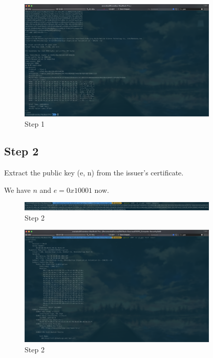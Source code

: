 \documentclass[onecolumn,oneside]{SUSTechHomework}
\begin{document}
  \begin{figure}[H]
    \centering
    \includegraphics[width=0.85\textwidth]{img/task6_2.png}
    \caption{Step 1}
  \end{figure}

  \subsection*{Step 2}

  Extract the public key (e, n) from the issuer’s certificate.

  We have $n$ and $e=0x10001$ now.

  \begin{figure}[H]
    \centering
    \includegraphics[width=0.85\textwidth]{img/task6_3.png}
    \caption{Step 2}
  \end{figure}

  \begin{figure}[H]
    \centering
    \includegraphics[width=0.85\textwidth]{img/task6_4.png}
    \caption{Step 2}
  \end{figure}
\end{document}
